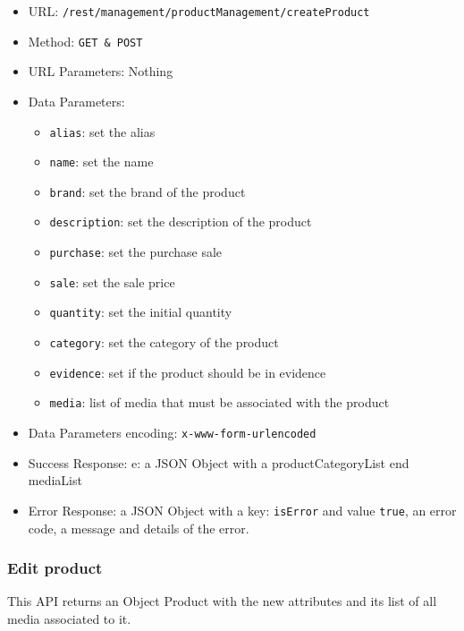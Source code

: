 \begin{itemize}
    \item URL: \texttt{/rest/management/productManagement/createProduct}
    \item Method: \texttt{{GET \& POST}}
    \item URL Parameters: Nothing
    \item Data Parameters: 
    \begin{itemize}
        \item \texttt{alias}: set the alias
        \item \texttt{name}: set the name
        \item \texttt{brand}: set the brand of the product
        \item \texttt{description}: set the description of the product
        \item \texttt{purchase}: set the purchase sale
        \item \texttt{sale}: set the sale price
        \item \texttt{quantity}: set the initial quantity
        \item \texttt{category}: set the category of the product
        \item \texttt{evidence}: set if the product should be in evidence
        \item \texttt{media}: list of media that must be associated with the product
    \end{itemize}
    \item Data Parameters encoding: \texttt{x-www-form-urlencoded}
    \item Success Response: e: a JSON Object with a productCategoryList end mediaList
    
    \item Error Response: a JSON Object with a key: \texttt{isError}  and value \texttt{true}, an error code, a message and details of the error.
\end{itemize}


\subsubsection*{Edit product}
This API returns an Object Product with the new attributes and its list of all media associated to it.

